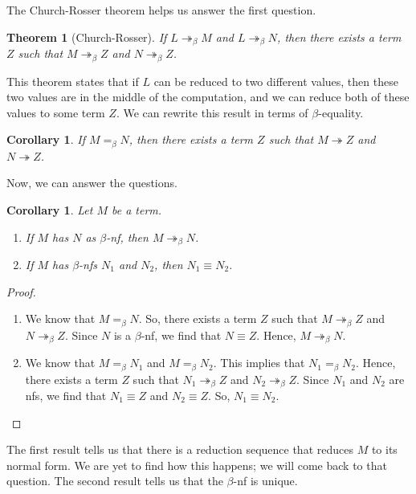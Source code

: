 \documentclass[a4paper, openany]{memoir}
\newtheorem{theorem}[proposition]{Theorem}
\newtheorem{corollary}[proposition]{Corollary}
\theoremstyle{definition}
\begin{document}
    The Church-Rosser theorem helps us answer the first question.
    \begin{theorem}[Church-Rosser]
        If $L \twoheadrightarrow_\beta M$ and $L \twoheadrightarrow_\beta N$, then there exists a term $Z$ such that $M \twoheadrightarrow_\beta Z$ and $N \twoheadrightarrow_\beta Z$.
    \end{theorem}
    \noindent This theorem states that if $L$ can be reduced to two different values, then these two values are in the middle of the computation, and we can reduce both of these values to some term $Z$. We can rewrite this result in terms of $\beta$-equality.
    \begin{corollary}
        If $M =_\beta N$, then there exists a term $Z$ such that $M \twoheadrightarrow Z$ and $N \twoheadrightarrow Z$.
    \end{corollary}
    \noindent Now, we can answer the questions.
    \begin{corollary}
        Let $M$ be a term.
        \begin{enumerate}
            \item If $M$ has $N$ as $\beta$-nf, then $M \twoheadrightarrow_\beta N$.
            \item If $M$ has $\beta$-nfs $N_1$ and $N_2$, then $N_1 \equiv N_2$.
        \end{enumerate}
    \end{corollary}
    \begin{proof}
        \hspace*{0pt}
        \begin{enumerate}
            \item We know that $M =_\beta N$. So, there exists a term $Z$ such that $M \twoheadrightarrow_\beta Z$ and $N \twoheadrightarrow_\beta Z$. Since $N$ is a $\beta$-nf, we find that $N \equiv Z$. Hence, $M \twoheadrightarrow_\beta N$.
            
            \item We know that $M =_\beta N_1$ and $M =_\beta N_2$. This implies that $N_1 =_\beta N_2$. Hence, there exists a term $Z$ such that $N_1 \twoheadrightarrow_\beta Z$ and $N_2 \twoheadrightarrow_\beta Z$. Since $N_1$ and $N_2$ are nfs, we find that $N_1 \equiv Z$ and $N_2 \equiv Z$. So, $N_1 \equiv N_2$.
        \end{enumerate}
    \end{proof}
    \noindent The first result tells us that there is a reduction sequence that reduces $M$ to its normal form. We are yet to find how this happens; we will come back to that question. The second result tells us that the $\beta$-nf is unique.
\end{document}
